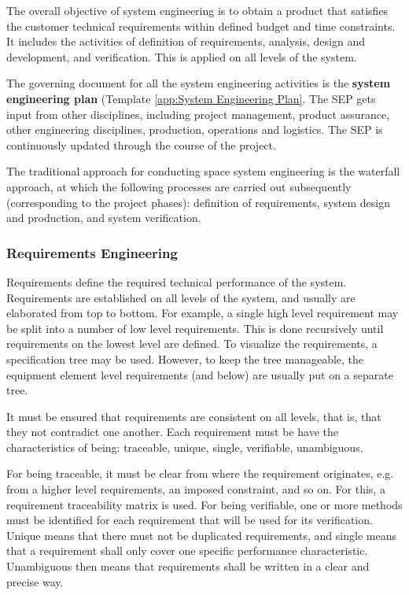 The overall objective of system engineering is to obtain a product that satisfies the customer technical requirements within defined budget and time constraints. It includes the activities of definition of requirements, analysis, design and development, and verification. This is applied on all levels of the system. 

The governing document for all the system engineering activities is the \textbf{system engineering plan} (Template \ref{app:System Engineering Plan}. The SEP gets input from other disciplines, including project management, product assurance, other engineering disciplines, production, operations and logistics. The SEP is continuously updated through the course of the project.

The traditional approach for conducting space system engineering is the waterfall approach, at which the following processes are carried out subsequently (corresponding to the project phases): definition of requirements, system design and production, and system verification.

\subsubsection{Requirements Engineering}

Requirements define the required technical performance of the system. Requirements are established on all levels of the system, and usually are elaborated from top to bottom. For example, a single high level requirement may be split into a number of low level requirements. This is done recursively until requirements on the lowest level are defined. To visualize the requirements, a specification tree may be used. However, to keep the tree manageable, the equipment element level requirements (and below) are usually put on a separate tree.

It must be ensured that requirements are consistent on all levels, that is, that they not contradict one another. Each requirement must be have the characteristics of being: traceable, unique, single, verifiable, unambiguous.

For being traceable, it must be clear from where the requirement originates, e.g. from a higher level requirements, an imposed constraint, and so on. For this, a requirement traceability matrix is used. For being verifiable, one or more methods must be identified for each requirement that will be used for its verification. Unique means that there must not be duplicated requirements, and single means that a requirement shall only cover one specific performance characteristic. Unambiguous then means that requirements shall be written in a clear and precise way. 


